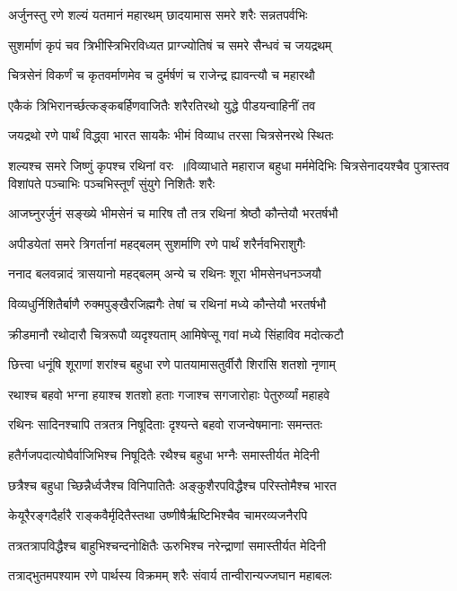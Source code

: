 \twolineshloka
{अर्जुनस्तु रणे शल्यं यतमानं महारथम्}
{छादयामास समरे शरैः सन्नतपर्वभिः}


\twolineshloka
{सुशर्माणं कृपं चव त्रिभीस्त्रिभिरविध्यत}
{प्राग्ज्योतिषं च समरे सैन्धवं च जयद्रथम्}


\twolineshloka
{चित्रसेनं विकर्णं च कृतवर्माणमेव च}
{दुर्मर्षणं च राजेन्द्र ह्यावन्त्यौ च महारथौ}


\twolineshloka
{एकैकं त्रिभिरानर्च्छत्कङ्कबर्हिणवाजितैः}
{शरैरतिरथो युद्धे पीडयन्वाहिनीं तव}


\twolineshloka
{जयद्रथो रणे पार्थं विद्ध्वा भारत सायकैः}
{भीमं विव्याध तरसा चित्रसेनरथे स्थितः}


शल्यश्च समरे जिष्णुं कृपश्च रथिनां वरः ॥विव्याधाते महाराज बहुधा मर्ममेदिभिः
\twolineshloka
{चित्रसेनादयश्चैव पुत्रास्तव विशांपते}
{पञ्चाभिः पञ्चभिस्तूर्णं सुंयुगे निशितैः शरैः}


\twolineshloka
{आजघ्नुरर्जुनं सङ्ख्ये भीमसेनं च मारिष}
{तौ तत्र रथिनां श्रेष्ठौ कौन्तेयौ भरतर्षभौ}


\twolineshloka
{अपीडयेतां समरे त्रिगर्तानां महद्बलम्}
{सुशर्माणि रणे पार्थं शरैर्नवभिराशुगैः}


\twolineshloka
{ननाद बलवन्नादं त्रासयानो महद्बलम्}
{अन्ये च रथिनः शूरा भीमसेनधनञ्जयौ}


\twolineshloka
{विव्यधुर्निशितैर्बाणै रुक्मपुङ्खैरजिह्मगैः}
{तेषां च रथिनां मध्ये कौन्तेयौ भरतर्षभौ}


\twolineshloka
{क्रीडमानौ रथोदारौ चित्ररूपौ व्यदृश्यताम्}
{आमिषेप्सू गवां मध्ये सिंहाविव मदोत्कटौ}


\twolineshloka
{छित्त्वा धनूंषि शूराणां शरांश्च बहुधा रणे}
{पातयामासतुर्वीरौ शिरांसि शतशो नृणाम्}


\twolineshloka
{रथाश्च बहवो भग्ना हयाश्च शतशो हताः}
{गजाश्च सगजारोहाः पेतुरुर्व्यां महाहवे}


\twolineshloka
{रथिनः सादिनश्चापि तत्रतत्र निषूदिताः}
{दृश्यन्ते बहवो राजन्वेषमानाः समन्ततः}


\twolineshloka
{हतैर्गजपदात्योघैर्वाजिभिश्च निषूदितैः}
{रथैश्च बहुधा भग्नैः समास्तीर्यत मेदिनी}


\twolineshloka
{छत्रैश्च बहुधा च्छिन्नैर्ध्वजैश्च विनिपातितैः}
{अङ्कुशैरपविद्धैश्च परिस्तोमैश्च भारत}


\twolineshloka
{केयूरैरङ्गदैर्हारै राङ्कवैर्मृदितैस्तथा}
{उष्णीषैर्ऋष्टिभिश्चैव चामरव्यजनैरपि}


\twolineshloka
{तत्रतत्रापविद्धैश्च बाहुभिश्चन्दनोक्षितैः}
{ऊरुभिश्च नरेन्द्राणां समास्तीर्यत मेदिनी}


\twolineshloka
{तत्राद्भुतमपश्याम रणे पार्थस्य विक्रमम्}
{शरैः संवार्य तान्वीरान्यज्जघान महाबलः}


